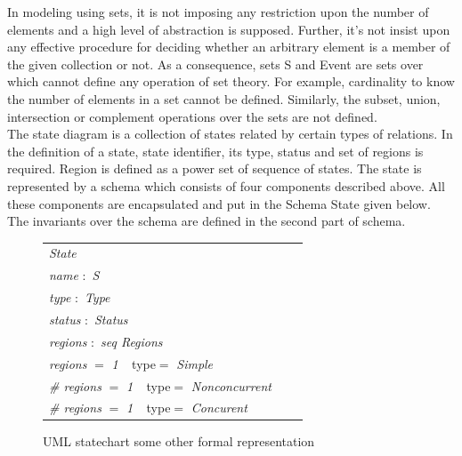 In modeling using sets, it is not imposing any restriction upon the number of elements and a high level of
abstraction is supposed. Further, it's not insist upon any
effective procedure for deciding whether an arbitrary
element is a member of the given collection or not. As a
consequence, sets S and Event are sets over which cannot define any operation of set theory. For example,
cardinality to know the number of elements in a set cannot
be defined. Similarly, the subset, union, intersection or
complement operations over the sets are not defined.\\

The state diagram is a collection of states related by
certain types of relations. In the definition of a state, state identifier, its type, status and set of regions is required. Region is defined as a power set of sequence of states. The state is represented by a schema which consists of four components described above. All these components are encapsulated and put in the Schema State given below.
The invariants over the schema are defined in the second
part of schema.\\

\begin{figure}[ht!]
	\centering
	\begin{tabular}{lll}
		\footnotesize                       
		\textit{State}       \\
		
		\footnotesize
		\textit{name}   $:$    \textit{S}  \\   
		\footnotesize
		\textit{type}   $:$    \textit{Type}  \\   
		\footnotesize
		\textit{status}   $:$    \textit{Status}      \\
		\footnotesize
		\textit{regions} $:$   \textit{seq Regions} \\
		
		\footnotesize
		\textit{regions} $=$   \textit{1} $\ \  $ {type}$=$   \textit{Simple} \\
		\footnotesize
		 \textit{\# regions} $=$   \textit{1} $\ \  $ {type}$=$   \textit{Nonconcurrent} \\
		 \textit{\# regions} $=$   \textit{1} $\ \  $ {type}$=$   \textit{Concurent} \\
		 
		
	\end{tabular}
	\caption{UML statechart some other formal representation}
	\label{statechart_formal_representation_part2}
\end{figure}

